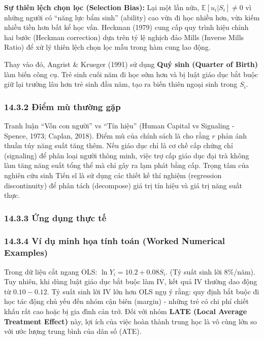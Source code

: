 \documentclass[
]{article}
\begin{document}
\textbf{Sự thiên lệch chọn lọc (Selection Bias):} Lại một lần nữa,
\(\mathbb{E}[u_i | S_i] \neq 0\) vì những người có ``năng lực bẩm sinh''
(ability) cao vừa đi học nhiều hơn, vừa kiếm nhiều tiền hơn bất kể học
vấn. Heckman (1979) cung cấp quy trình hiệu chỉnh hai bước (Heckman
correction) dựa trên tỷ lệ nghịch đảo Mills (Inverse Mills Ratio) để xử
lý thiên lệch chọn lọc mẫu trong hàm cung lao động.

Thay vào đó, Angrist \& Krueger (1991) sử dụng \textbf{Quý sinh (Quarter
of Birth)} làm biến công cụ. Trẻ sinh cuối năm đi học sớm hơn và bị luật
giáo dục bắt buộc giữ lại trường lâu hơn trẻ sinh đầu năm, tạo ra biến
thiên ngoại sinh trong \(S_i\).

\subsubsection{14.3.2 Điểm mù thường
gặp}\label{ux111iux1ec3m-muxf9-thux1b0ux1eddng-gux1eb7p-8}

Tranh luận ``Vốn con người'' vs ``Tín hiệu'' (Human Capital vs Signaling
- Spence, 1973; Caplan, 2018). Điểm mù của chính sách là cho rằng \(r\)
phản ánh thuần túy năng suất tăng thêm. Nếu giáo dục chỉ là cơ chế cấp
chứng chỉ (signaling) để phân loại người thông minh, việc trợ cấp giáo
dục đại trà không làm tăng năng suất tổng thể mà chỉ gây ra lạm phát
bằng cấp. Trọng tâm của nghiên cứu sinh Tiến sĩ là sử dụng các thiết kế
thí nghiệm (regression discontinuity) để phân tách (decompose) giá trị
tín hiệu và giá trị năng suất thực.

\subsubsection{14.3.3 Ứng dụng thực
tế}\label{ux1ee9ng-dux1ee5ng-thux1ef1c-tux1ebf-2}

\subsubsection{14.3.4 Ví dụ minh họa tính toán (Worked Numerical
Examples)}\label{vuxed-dux1ee5-minh-hux1ecda-tuxednh-touxe1n-worked-numerical-examples-40}

Trong dữ liệu cắt ngang OLS: \(\ln Y_i = 10.2 + 0.08 S_i\). (Tỷ suất
sinh lời 8\%/năm). Tuy nhiên, khi dùng luật giáo dục bắt buộc làm IV,
kết quả IV thường dao động từ \(0.10 - 0.12\). Tỷ suất sinh lời IV lớn
hơn OLS ngụ ý rằng: quy định bắt buộc đi học tác động chủ yếu đến nhóm
cận biên (margin) - những trẻ có chi phí chiết khấu rất cao hoặc bị gia
đình cản trở. Đối với nhóm \textbf{LATE (Local Average Treatment
Effect)} này, lợi ích của việc hoàn thành trung học là vô cùng lớn so
với ước lượng trung bình của dân số (ATE).
\end{document}
